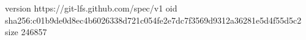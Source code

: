 version https://git-lfs.github.com/spec/v1
oid sha256:c01b9de0d8ec4b6026338d721c054fe2e7dc7f3569d9312a36281e5d4f55d5c2
size 246857
